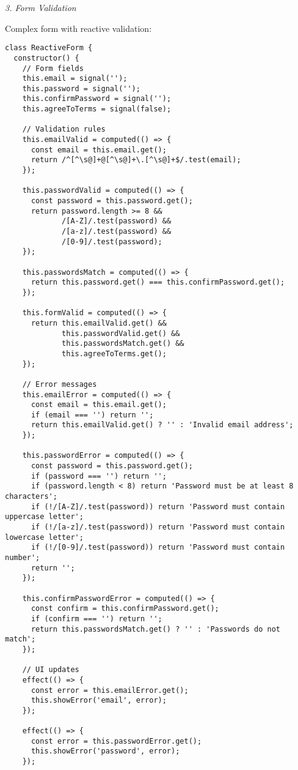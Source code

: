 \documentclass[11pt]{article}
\begin{document}
\emph{3. Form Validation}

Complex form with reactive validation:

\begin{verbatim}
class ReactiveForm {
  constructor() {
    // Form fields
    this.email = signal('');
    this.password = signal('');
    this.confirmPassword = signal('');
    this.agreeToTerms = signal(false);
    
    // Validation rules
    this.emailValid = computed(() => {
      const email = this.email.get();
      return /^[^\s@]+@[^\s@]+\.[^\s@]+$/.test(email);
    });
    
    this.passwordValid = computed(() => {
      const password = this.password.get();
      return password.length >= 8 &&
             /[A-Z]/.test(password) &&
             /[a-z]/.test(password) &&
             /[0-9]/.test(password);
    });
    
    this.passwordsMatch = computed(() => {
      return this.password.get() === this.confirmPassword.get();
    });
    
    this.formValid = computed(() => {
      return this.emailValid.get() &&
             this.passwordValid.get() &&
             this.passwordsMatch.get() &&
             this.agreeToTerms.get();
    });
    
    // Error messages
    this.emailError = computed(() => {
      const email = this.email.get();
      if (email === '') return '';
      return this.emailValid.get() ? '' : 'Invalid email address';
    });
    
    this.passwordError = computed(() => {
      const password = this.password.get();
      if (password === '') return '';
      if (password.length < 8) return 'Password must be at least 8 characters';
      if (!/[A-Z]/.test(password)) return 'Password must contain uppercase letter';
      if (!/[a-z]/.test(password)) return 'Password must contain lowercase letter';
      if (!/[0-9]/.test(password)) return 'Password must contain number';
      return '';
    });
    
    this.confirmPasswordError = computed(() => {
      const confirm = this.confirmPassword.get();
      if (confirm === '') return '';
      return this.passwordsMatch.get() ? '' : 'Passwords do not match';
    });
    
    // UI updates
    effect(() => {
      const error = this.emailError.get();
      this.showError('email', error);
    });
    
    effect(() => {
      const error = this.passwordError.get();
      this.showError('password', error);
    });
    

\end{verbatim}
\end{document}
